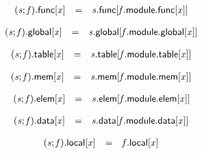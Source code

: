 $$
\begin{array}{@{}lcl@{}l@{}}
{({\mathit{s}} ; {\mathit{f}}).\mathsf{func}}{{}[{\mathit{x}}]} &=& {\mathit{s}}.\mathsf{func}{}[{\mathit{f}}.\mathsf{module}.\mathsf{func}{}[{\mathit{x}}]] &  \\
\end{array}
$$

$$
\begin{array}{@{}lcl@{}l@{}}
{({\mathit{s}} ; {\mathit{f}}).\mathsf{global}}{{}[{\mathit{x}}]} &=& {\mathit{s}}.\mathsf{global}{}[{\mathit{f}}.\mathsf{module}.\mathsf{global}{}[{\mathit{x}}]] &  \\
\end{array}
$$

$$
\begin{array}{@{}lcl@{}l@{}}
{({\mathit{s}} ; {\mathit{f}}).\mathsf{table}}{{}[{\mathit{x}}]} &=& {\mathit{s}}.\mathsf{table}{}[{\mathit{f}}.\mathsf{module}.\mathsf{table}{}[{\mathit{x}}]] &  \\
\end{array}
$$

$$
\begin{array}{@{}lcl@{}l@{}}
{({\mathit{s}} ; {\mathit{f}}).\mathsf{mem}}{{}[{\mathit{x}}]} &=& {\mathit{s}}.\mathsf{mem}{}[{\mathit{f}}.\mathsf{module}.\mathsf{mem}{}[{\mathit{x}}]] &  \\
\end{array}
$$

$$
\begin{array}{@{}lcl@{}l@{}}
{({\mathit{s}} ; {\mathit{f}}).\mathsf{elem}}{{}[{\mathit{x}}]} &=& {\mathit{s}}.\mathsf{elem}{}[{\mathit{f}}.\mathsf{module}.\mathsf{elem}{}[{\mathit{x}}]] &  \\
\end{array}
$$

$$
\begin{array}{@{}lcl@{}l@{}}
{({\mathit{s}} ; {\mathit{f}}).\mathsf{data}}{{}[{\mathit{x}}]} &=& {\mathit{s}}.\mathsf{data}{}[{\mathit{f}}.\mathsf{module}.\mathsf{data}{}[{\mathit{x}}]] &  \\
\end{array}
$$

$$
\begin{array}{@{}lcl@{}l@{}}
{({\mathit{s}} ; {\mathit{f}}).\mathsf{local}}{{}[{\mathit{x}}]} &=& {\mathit{f}}.\mathsf{local}{}[{\mathit{x}}] &  \\
\end{array}
$$

\vspace{1ex}

